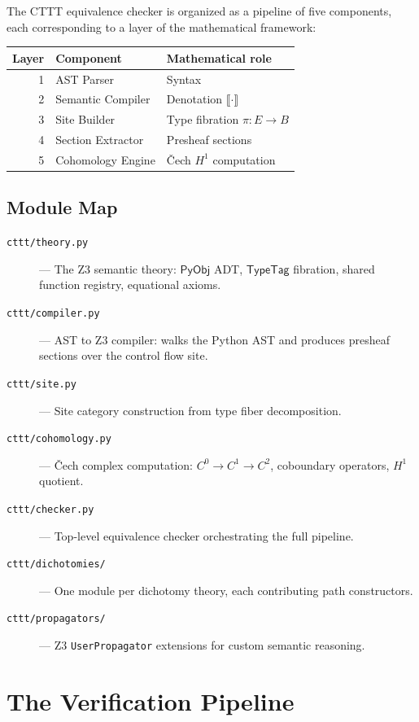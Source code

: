 \documentclass[11pt,a4paper]{report}
\theoremstyle{definition}
\theoremstyle{plain}
\newcommand{\den}[1]{\llbracket #1 \rrbracket}     %
\newcommand{\PyObj}{\mathsf{PyObj}}
\newcommand{\Hone}{H^1}
\begin{document}
The CTTT equivalence checker is organized as a pipeline of five
components, each corresponding to a layer of the mathematical
framework:

\begin{center}
\begin{tabular}{r l l}
  \textbf{Layer} & \textbf{Component} & \textbf{Mathematical role} \\
  \hline
  1 & AST Parser & Syntax \\
  2 & Semantic Compiler & Denotation $\den{\cdot}$ \\
  3 & Site Builder & Type fibration $\pi : E \to B$ \\
  4 & Section Extractor & Presheaf sections \\
  5 & Cohomology Engine & \v{C}ech $\Hone$ computation \\
\end{tabular}
\end{center}

\section{Module Map}

\begin{description}
  \item[\texttt{cttt/theory.py}] --- The Z3 semantic theory: $\PyObj$
    ADT, $\mathsf{TypeTag}$ fibration, shared function registry,
    equational axioms.
  \item[\texttt{cttt/compiler.py}] --- AST to Z3 compiler: walks
    the Python AST and produces presheaf sections over the control
    flow site.
  \item[\texttt{cttt/site.py}] --- Site category construction from
    type fiber decomposition.
  \item[\texttt{cttt/cohomology.py}] --- \v{C}ech complex computation:
    $C^0 \to C^1 \to C^2$, coboundary operators, $\Hone$ quotient.
  \item[\texttt{cttt/checker.py}] --- Top-level equivalence checker
    orchestrating the full pipeline.
  \item[\texttt{cttt/dichotomies/}] --- One module per dichotomy
    theory, each contributing path constructors.
  \item[\texttt{cttt/propagators/}] --- Z3 \texttt{UserPropagator}
    extensions for custom semantic reasoning.
\end{description}


\chapter{The Verification Pipeline}
\label{ch:pipeline}
\end{document}
